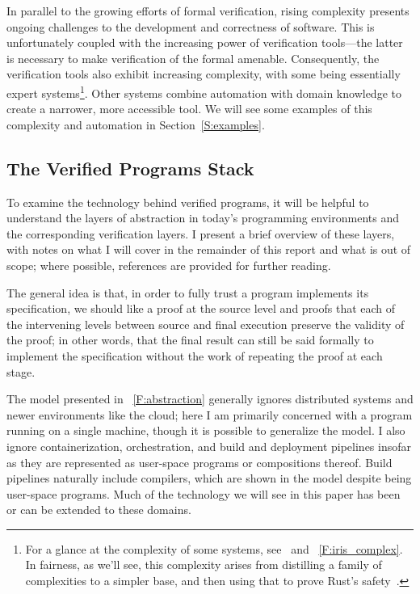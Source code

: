 In parallel to the growing efforts of formal verification, rising complexity
presents ongoing challenges to the development and correctness of software. This
is unfortunately coupled with the increasing power of verification tools---the
latter is necessary to make verification of the formal amenable. Consequently,
the verification tools also exhibit increasing complexity, with some being
essentially expert systems\footnote{For a glance at the complexity of some
systems, see~\cite{Jung_2015,Jung_2016,Krebbers_2017a,Jung_2018b} and
\figurename~\ref{F:iris_complex}. In fairness, as we'll see, this complexity
arises from distilling a family of complexities to a simpler base, and then
using that to prove Rust's safety~\cite{Jung_2018a}.}. Other systems combine
automation with domain knowledge to create a narrower, more accessible tool. We
will see some examples of this complexity and automation in
Section~\ref{S:examples}.

\subsection{The Verified Programs Stack}\label{S:stack}

To examine the technology behind verified programs, it will be helpful to
understand the layers of abstraction in today's programming environments and the
corresponding verification layers. I present a brief overview of these layers,
with notes on what I will cover in the remainder of this report and what is out
of scope; where possible, references are provided for further reading.

The general idea is that, in order to fully trust a program implements its
specification, we should like a proof at the source level and proofs that each
of the intervening levels between source and final execution preserve the
validity of the proof; in other words, that the final result can still be said
formally to implement the specification without the work of repeating the proof
at each stage.

The model presented in \figurename~\ref{F:abstraction} generally ignores
distributed systems and newer environments like the cloud; here I am primarily
concerned with a program running on a single machine, though it is possible to
generalize the model. I also ignore containerization, orchestration, and build
and deployment pipelines insofar as they are represented as user-space programs
or compositions thereof. Build pipelines naturally include compilers, which are
shown in the model despite being user-space programs. Much of the technology we
will see in this paper has been or can be extended to these domains.

